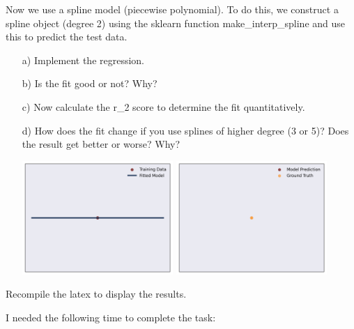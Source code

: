 Now we use a spline model (piecewise polynomial). To do this, we construct a spline object (degree 2) using the sklearn function make\_interp\_spline and use this to predict the test data.

\begin{enumerate}

\item[a)] Implement the regression.

\item[b)] Is the fit good or not? Why? 

\item[c)] Now calculate the r\_2 score to determine the fit quantitatively.

\item[d)] How does the fit change if you use splines of higher degree (3 or 5)? Does the result get better or worse? Why?

\includegraphics[width=0.45\textwidth]{source_code/overfit_spline_model.png}
\includegraphics[width=0.45\textwidth]{source_code/overfit_spline_testdata.png}

\end{enumerate}

Recompile the latex to display the results.

I needed the following time to complete the task:

